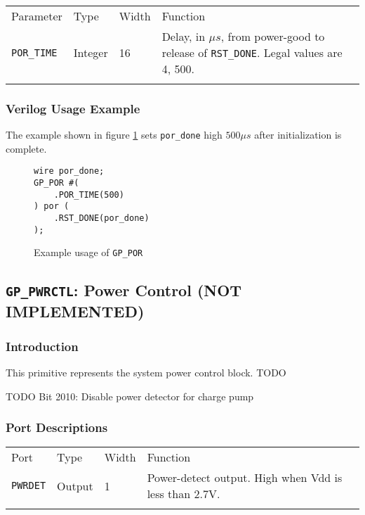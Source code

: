 \documentclass[11pt]{article}
\newcommand{\tokenstyle}[1]{\texttt{#1}}
\newcommand{\wirestyle}[1]{\texttt{#1}}
\newcommand{\whenstyle}[1]{{\fontseries{sb}\selectfont#1}}
\newcommand{\thinhline}{\Xhline{1\arrayrulewidth}}
\newcommand{\thickhline}{\Xhline{2.5\arrayrulewidth}}
\begin{document}
\begin{tabularx}{\textwidth}{lllX}
\thinhline
\whenstyle{Parameter} & \whenstyle{Type} & \whenstyle{Width} & \whenstyle{Function} \\
\thickhline
\tokenstyle{POR\_TIME} & Integer & 16 & Delay, in $\mu s$, from power-good to release of \tokenstyle{RST\_DONE}. Legal values are 4, 500.\\
\thinhline
\end{tabularx}

\subsubsection{Verilog Usage Example}

The example shown in figure \ref{gp-por-example} sets \wirestyle{por\_done} high $500 \mu s$ after initialization is complete.

\begin{figure}[h]
\begin{lstlisting}
wire por_done;
GP_POR #(
	.POR_TIME(500)
) por (
	.RST_DONE(por_done)
);
\end{lstlisting}
\caption{Example usage of \tokenstyle{GP\_POR}}
\label{gp-por-example}
\end{figure}



\pagebreak
\clearpage
\subsection{\tokenstyle{GP\_PWRCTL}: Power Control (NOT IMPLEMENTED)}
\label{gp-pwrctl}

\subsubsection{Introduction}
This primitive represents the system power control block. TODO


TODO
Bit 2010: Disable power detector for charge pump

\subsubsection{Port Descriptions}

\begin{tabularx}{\textwidth}{lllX}
\thinhline
\whenstyle{Port} & \whenstyle{Type} & \whenstyle{Width} & \whenstyle{Function} \\
\thickhline
\tokenstyle{PWRDET} & Output & 1 & Power-detect output. High when Vdd is less than 2.7V.\\
\thinhline
\end{tabularx}
\end{document}
